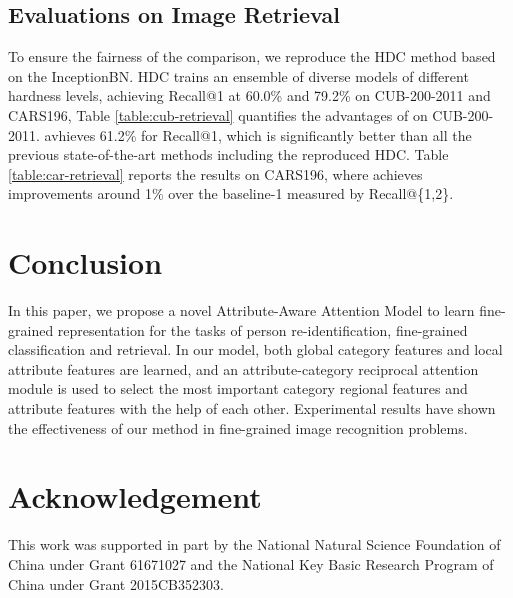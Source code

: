 \documentclass[sigconf]{acmart}
\begin{document}
\subsection{Evaluations on Image Retrieval}
To ensure the fairness of the comparison, we reproduce the HDC method based on the InceptionBN. HDC \cite{hdc} trains an ensemble of diverse models of different hardness levels, achieving Recall@1 at 60.0\% and 79.2\% on CUB-200-2011 and CARS196, Table \ref{table:cub-retrieval} quantifies the advantages of  on CUB-200-2011.  avhieves 61.2\% for Recall@1, which is significantly better than all the previous state-of-the-art methods including the reproduced HDC. Table \ref{table:car-retrieval} reports the results on CARS196, where  achieves improvements around 1\% over the baseline-1 measured by Recall@\{1,2\}.

\section{Conclusion}
In this paper, we propose a novel Attribute-Aware Attention Model to learn fine-grained representation for the tasks of person re-identification, fine-grained classification and retrieval. In our model, both global category features and local attribute features are learned, and an attribute-category reciprocal attention module is used to select the most important category regional features and attribute features with the help of each other. Experimental results have shown the effectiveness of our method in fine-grained image recognition problems.

\section*{Acknowledgement}
This work was supported in part by the National Natural Science Foundation of China under Grant 61671027 and the National Key Basic Research Program of China  under Grant 2015CB352303.

 
\nocite{han2018autoencoder}




\end{document}
